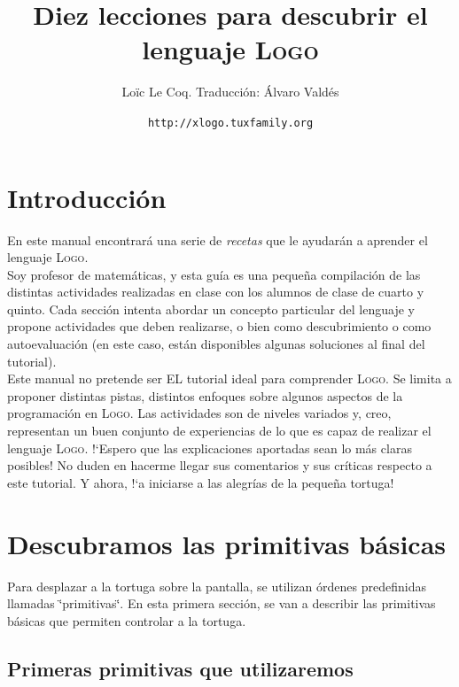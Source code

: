 \documentclass[12pt,twoside,spanish,a4paper]{report}
\title{Diez lecciones para descubrir el lenguaje \textsc{Logo}}
\author{Lo\"ic Le Coq. Traducci\'on: \'Alvaro Vald\'es} %
\date{\texttt{http://xlogo.tuxfamily.org}}
\begin{document}
\maketitle

\newpage

\tableofcontents{}

\newpage{}

\chapter*{Introducci\'on}

En este manual encontrar\'a una serie de \textit{recetas} que le ayudar\'an a
aprender el lenguaje \textsc{Logo}. \\

Soy profesor de matem\'aticas, y esta gu\'ia es una peque\~na compilaci\'on
de las distintas actividades realizadas en clase con los alumnos de
clase de cuarto y quinto. Cada secci\'on intenta abordar un concepto
particular del lenguaje y propone actividades que deben realizarse,
o bien como descubrimiento o como autoevaluaci\'on (en este caso,
est\'an disponibles algunas soluciones al final del tutorial). \\

Este manual no pretende ser EL tutorial ideal para comprender \textsc{Logo}.
Se limita a proponer distintas pistas, distintos enfoques sobre algunos
aspectos de la programaci\'on en \textsc{Logo}. Las actividades son
de niveles variados y, creo, representan un buen conjunto de experiencias
de lo que es capaz de realizar el lenguaje \textsc{Logo}. !`Espero
que las explicaciones aportadas sean lo m\'as claras posibles! No duden
en hacerme llegar sus comentarios y sus cr\'iticas respecto a este tutorial.
Y ahora, !`a iniciarse a las alegr\'ias de la peque\~na tortuga!

\newpage{}

\chapter{Descubramos las primitivas b\'asicas}
   \label{sec:Descubrir-las-primitivas}

Para desplazar a la tortuga sobre la pantalla, se utilizan \'ordenes
predefinidas llamadas \char`\"{}primitivas\char`\"{}. En esta primera
secci\'on, se van a describir las primitivas b\'asicas que permiten controlar
a la tortuga.

\section{Primeras primitivas que utilizaremos}
   \label{sub:Nuevas-primitivas}
\end{document}
